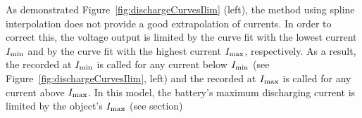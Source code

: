 As demonstrated Figure~\ref{fig:dischargeCurvesIlim} (left), the  method using spline interpolation does not provide a good extrapolation of currents. In order to correct this, the voltage output is limited by the curve fit with the lowest current $I_\text{min}$ and by the curve fit with the highest current $I_\text{max}$, respectively. As a result, the  recorded at $I_\text{min}$ is called for any current below $I_\text{min}$ (see Figure~\ref{fig:dischargeCurvesIlim}, left) and the  recorded at $I_\text{max}$ is called for any current above $I_\text{max}$. In this model, the battery's maximum discharging current is limited by the  object's $I_\text{max}$ (see section)